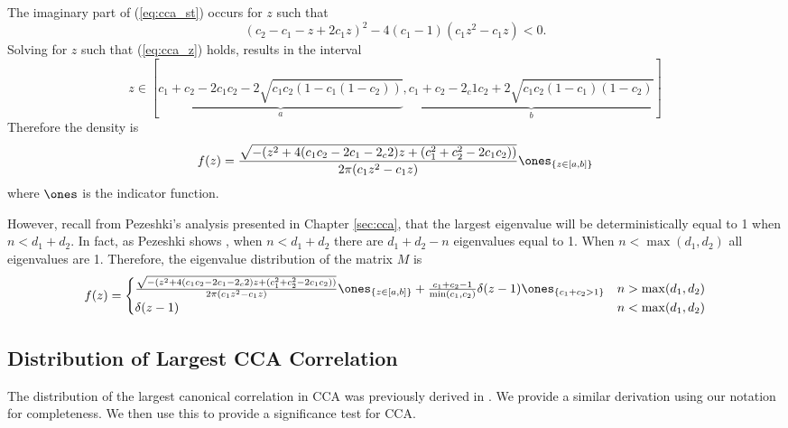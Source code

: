 The imaginary part of (\ref{eq:cca_st}) occurs for $z$ such that
\begin{equation}\label{eq:cca_z}
(c_2-c_1-z+2c_1z)^2-4(c_1-1)(c_1z^2-c_1z) <0.
\end{equation}
Solving for $z$ such that (\ref{eq:cca_z}) holds, results in the interval
\begin{equation}
z\in \left[ \underbrace{c_1+c_2-2c_1c_2-2\sqrt{c_1c_2(1-c_1(1-c_2))}}_{a},
  \underbrace{c_1+c_2-2_c1c_2 +2\sqrt{c_1c_2(1-c_1)(1-c_2)}}_{b} \right]
\end{equation}
Therefore the density is
\begin{equation}
  f(z) = \frac{\sqrt{-(z^2 + 4(c_1c_2-2c_1-2_c2)z +
      (c_1^2+c_2^2-2c_1c_2))}}{2\pi(c_1z^2-c_1z)}\ones_{\{z\in[a,b]\}} 
\end{equation}
where $\ones$ is the indicator function. 

However, recall from Pezeshki's analysis presented in Chapter \ref{sec:cca}, that the
largest eigenvalue will be deterministically equal to 1 when $n<d_1+d_2$. In fact, as
Pezeshki shows \cite{pezeshki2004empirical}, when $n<d_1+d_2$ there are $d_1+d_2-n$
eigenvalues equal to 1. When $n<\max(d_1,d_2)$ all eigenvalues are 1. Therefore, the
eigenvalue distribution of the matrix $M$ is
\begin{equation}
  f(z) = \begin{cases}
    \frac{\sqrt{-(z^2 + 4(c_1c_2-2c_1-2_c2)z +
        (c_1^2+c_2^2-2c_1c_2))}}{2\pi(c_1z^2-c_1z)}\ones_{\{z\in[a,b]\}}  + \frac{c_1+c_2-1}{\min(c_1,c_2)}\delta(z-1)\ones_{\{c_1+c_2>1\}}& n > \max(d_1,d_2)\\
    \delta(z-1) & n < \max(d_1,d_2)\\
    \end{cases}
\end{equation}

\subsection{Distribution of Largest CCA Correlation}

The distribution of the largest canonical correlation in CCA was previously derived in
\cite{johnstone2008multivariate}. We provide a similar derivation using our notation for
completeness. We then use this to provide a significance test for CCA.

